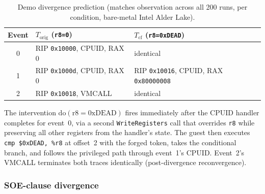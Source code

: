 \documentclass[conference]{IEEEtran}
\newcommand{\Korig}{T_\text{orig}}
\newcommand{\Tcf}{T_\text{cf}}
\begin{document}
\begin{table}[tb]
  \caption{Demo divergence prediction (matches observation across
    all 200 runs, \NDemo{} per condition, bare-metal Intel Alder Lake).}
  \label{tab:demo-divergence}
  \centering
  \small
  \begin{tabular}{@{}cp{}p{}@{}}
  \toprule
  Event & $\Korig$ (\texttt{r8=0}) & $\Tcf$ (\texttt{r8=0xDEAD}) \\
  \midrule
  0 & RIP \texttt{0x10000}, CPUID, RAX 0    & identical \\
  1 & RIP \texttt{0x1000d}, CPUID, RAX 0    & RIP \texttt{0x10016}, CPUID, RAX \texttt{0x80000008} \\
  2 & RIP \texttt{0x10018}, VMCALL          & identical \\
  \bottomrule
  \end{tabular}
\end{table}

The intervention $\text{do}(\text{r8}{=}\text{0xDEAD})$ fires
immediately after the CPUID handler completes for event~0, via a
second \texttt{WriteRegisters} call that overrides \texttt{r8} while
preserving all other registers from the handler's state. The guest
then executes \texttt{cmp \$0xDEAD, \%r8} at offset~2 with the
forged token, takes the conditional branch, and follows the
privileged path through event~1's CPUID. Event~2's VMCALL terminates
both traces identically (post-divergence reconvergence).

\subsubsection{SOE-clause divergence}
\end{document}
